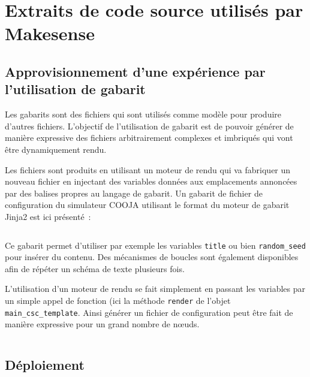 \chapter{Extraits de code source utilisés par Makesense}
\label{code}

\section{Approvisionnement d'une expérience par l'utilisation de gabarit}
\label{code:templating}

Les gabarits sont des fichiers qui sont utilisés comme modèle pour produire d'autres fichiers.
L'objectif de l'utilisation de gabarit est de pouvoir générer de manière expressive des fichiers arbitrairement complexes et imbriqués qui vont être dynamiquement rendu.

Les fichiers sont produits en utilisant un moteur de rendu qui va fabriquer un nouveau fichier en injectant des variables données aux emplacements annoncées par des balises propres au langage de gabarit.
Un gabarit de fichier de configuration du simulateur COOJA utilisant le format du moteur de gabarit Jinja2 est ici présenté~:

\inputminted{django}{snippets/template.jinja2}

Ce gabarit permet d'utiliser par exemple les variables \texttt{title} ou bien \texttt{random\_seed} pour insérer du contenu.
Des mécanismes de boucles sont également disponibles afin de répéter un schéma de texte plusieurs fois.

L'utilisation d'un moteur de rendu se fait simplement en passant les variables par un simple appel de fonction (ici la méthode \texttt{render} de l'objet \texttt{main\_csc\_template}.
Ainsi générer un fichier de configuration peut être fait de manière expressive pour un grand nombre de nœuds.

\inputminted{python}{snippets/jinja2.py}

\section{Déploiement} %
\label{code:deploiement}



